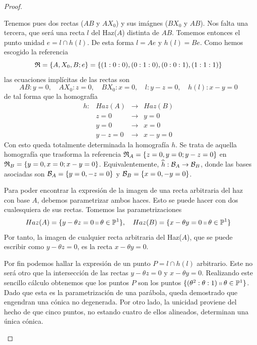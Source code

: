 \begin{proof}
\begin{enumerate}
		Tenemos pues dos rectas ($AB$ y $AX_0$) y sus imágnes ($BX_0$ y $AB$). Nos falta una tercera, que será una recta $l$ del Haz($A$) distinta de $AB$. Tomemos entonces el punto unidad $e=l\cap h(l)$. De esta forma $l=Ae$ y $h(l)=Be$. Como hemos escogido la referencia \[\mathfrak{R}=\{A,X_0,B;e\}=\{(1:0:0),(0:1:0),(0:0:1),(1:1:1)\}\]
		las ecuaciones implícitas de las rectas son
		\begin{equation*}
			AB:y=0, \quad AX_0: z=0, \quad BX_0:x=0, \quad l:y-z=0, \quad h(l):x-y=0
		\end{equation*}
		de tal forma que la homografía
		\begin{equation*}
			\begin{array}{cccc}
			h:& Haz(A)&\rightarrow&Haz(B)\\
			&z=0 &\rightarrow& y=0\\
			&y=0 &\rightarrow& x=0\\
			&y-z=0 &\rightarrow& x-y=0
			\end{array}
		\end{equation*}
		Con esto queda totalmente determinada la homografía $h$. Se trata de aquella homografía que trasforma la referencia $\mathfrak{R}_A=\{z=0,y=0;y-z=0\}$ en $\mathfrak{R}_B=\{y=0,x=0;x-y=0\}$. Equivalentemente, $\widehat{h}:\mathcal{B}_A\rightarrow \mathcal{B}_B$, donde las bases asociadas son $\mathcal{B}_A=\{y=0,-z=0\}$ y $\mathcal{B}_B=\{x=0,-y=0\}$.
		
		Para poder encontrar la expresión de la imagen de una recta arbitraria del haz con base $A$, debemos parametrizar ambos haces. Esto se puede hacer con dos cualesquiera de sus rectas. Tomemos las parametrizaciones
		\begin{equation*}
			Haz(A)=\{y-\theta z=0\shortparallel \theta\in\mathbb{P}^1\}, \quad Haz(B)=\{x-\theta y=0\shortparallel \theta\in\mathbb{P}^1\}
		\end{equation*}
		Por tanto, la imagen de cualquier recta arbitraria del Haz($A$), que se puede escribir como $y-\theta z=0$, es la recta $x-\theta y=0$.
		
		Por fin podemos hallar la expresión de un punto $P=l\cap h(l)$ arbitrario. Este no será otro que la intersección de las rectas $y-\theta z=0$ y $x-\theta y=0$. Realizando este sencillo cálculo obtenemos que los puntos $P$ son los puntos $\{(\theta^2:\theta:1)\shortparallel \theta\in\mathbb{P}^1\}$. Dado que esta es la parametrización de una parábola, queda demostrado que engendran una cónica no degenerada. Por otro lado, la unicidad proviene del hecho de que cinco puntos, no estando cuatro de ellos alineados, determinan una única cónica.
		

\end{enumerate}
\end{proof}

